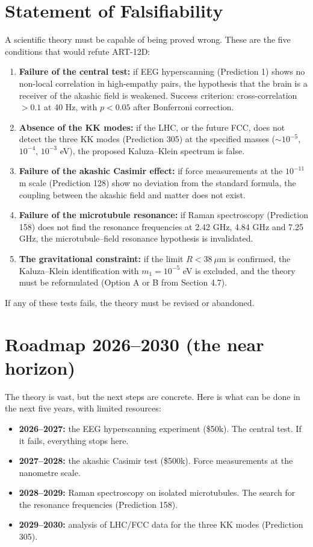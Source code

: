 \section{Statement of Falsifiability}
A scientific theory must be capable of being proved wrong. These are the five conditions that would refute ART-12D:
\begin{enumerate}
    \item \textbf{Failure of the central test:} if EEG hyperscanning (Prediction 1) shows no non-local correlation in high-empathy pairs, the hypothesis that the brain is a receiver of the akashic field is weakened. Success criterion: cross-correlation $> 0.1$ at 40 Hz, with $p < 0.05$ after Bonferroni correction.
    \item \textbf{Absence of the KK modes:} if the LHC, or the future FCC, does not detect the three KK modes (Prediction 305) at the specified masses ($\sim 10^{-5}$, $10^{-4}$, $10^{-3}$ eV), the proposed Kaluza--Klein spectrum is false.
    \item \textbf{Failure of the akashic Casimir effect:} if force measurements at the $10^{-11}$ m scale (Prediction 128) show no deviation from the standard formula, the coupling between the akashic field and matter does not exist.
    \item \textbf{Failure of the microtubule resonance:} if Raman spectroscopy (Prediction 158) does not find the resonance frequencies at 2.42 GHz, 4.84 GHz and 7.25 GHz, the microtubule--field resonance hypothesis is invalidated.
    \item \textbf{The gravitational constraint:} if the limit $R < 38\ \mu$m is confirmed, the Kaluza--Klein identification with $m_1 = 10^{-5}$ eV is excluded, and the theory must be reformulated (Option A or B from Section 4.7).
\end{enumerate}
If any of these tests fails, the theory must be revised or abandoned.

\section{Roadmap 2026--2030 (the near horizon)}
The theory is vast, but the next steps are concrete. Here is what can be done in the next five years, with limited resources:
\begin{itemize}
    \item \textbf{2026--2027:} the EEG hyperscanning experiment (\$50k). The central test. If it fails, everything stops here.
    \item \textbf{2027--2028:} the akashic Casimir test (\$500k). Force measurements at the nanometre scale.
    \item \textbf{2028--2029:} Raman spectroscopy on isolated microtubules. The search for the resonance frequencies (Prediction 158).
    \item \textbf{2029--2030:} analysis of LHC/FCC data for the three KK modes (Prediction 305).
\end{itemize}

\newpage
